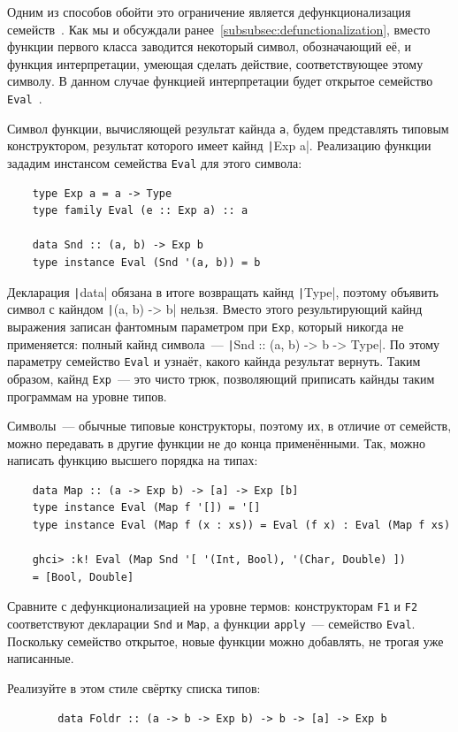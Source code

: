 Одним из способов обойти это ограничение является дефункционализация семейств~\cite{defunctionalization-slides, eisenberg2014promoting}.
Как мы и обсуждали ранее~\ref{subsubsec:defunctionalization}, вместо функции первого класса заводится некоторый символ, обозначающий её, и функция интерпретации, умеющая сделать действие, соответствующее этому символу.
В данном случае функцией интерпретации будет открытое семейство \texttt{Eval}~\cite[глава 10]{maguire-types}.

Символ функции, вычисляющей результат кайнда \texttt{a}, будем представлять типовым конструктором, результат которого имеет кайнд \texttt|Exp a|.
Реализацию функции зададим инстансом семейства \texttt{Eval} для этого символа:
\begin{verbatim}
    type Exp a = a -> Type
    type family Eval (e :: Exp a) :: a

    data Snd :: (a, b) -> Exp b
    type instance Eval (Snd '(a, b)) = b
\end{verbatim}
Декларация \texttt|data| обязана в итоге возвращать кайнд \texttt|Type|, поэтому объявить символ с кайндом \texttt|(a, b) -> b| нельзя.
Вместо этого результирующий кайнд выражения записан фантомным параметром при \texttt{Exp}, который никогда не применяется: полный кайнд символа~--- \texttt|Snd :: (a, b) -> b -> Type|.
По этому параметру семейство \texttt{Eval} и узнаёт, какого кайнда результат вернуть.
Таким образом, кайнд \texttt{Exp}~--- это чисто трюк, позволяющий приписать кайнды таким программам на уровне типов.

Символы~--- обычные типовые конструкторы, поэтому их, в отличие от семейств, можно передавать в другие функции не до конца применёнными.
Так, можно написать функцию высшего порядка на типах:
\begin{verbatim}
    data Map :: (a -> Exp b) -> [a] -> Exp [b]
    type instance Eval (Map f '[]) = '[]
    type instance Eval (Map f (x : xs)) = Eval (f x) : Eval (Map f xs)

    ghci> :k! Eval (Map Snd '[ '(Int, Bool), '(Char, Double) ])
    = [Bool, Double]
\end{verbatim}
Сравните с дефункционализацией на уровне термов: конструкторам \texttt{F1} и \texttt{F2} соответствуют декларации \texttt{Snd} и \texttt{Map}, а функции \texttt{apply}~--- семейство \texttt{Eval}.
Поскольку семейство открытое, новые функции можно добавлять, не трогая уже написанные.

\begin{task}
    Реализуйте в этом стиле свёртку списка типов:
    \begin{verbatim}
        data Foldr :: (a -> b -> Exp b) -> b -> [a] -> Exp b
    \end{verbatim}
\end{task}

